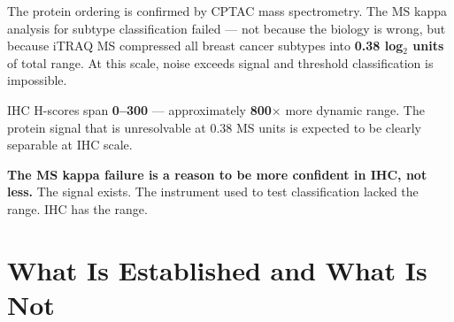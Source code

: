 \documentclass[11pt, a4paper]{article}
\begin{document}
\begin{mdframed}[backgroundcolor=dynamicbox,
                 linecolor=green!60!black,
                 linewidth=1pt]
The protein ordering is confirmed by CPTAC
mass spectrometry. The MS kappa analysis for
subtype classification failed --- not because
the biology is wrong, but because iTRAQ MS
compressed all breast cancer subtypes into
\textbf{0.38 log$_2$ units} of total range.
At this scale, noise exceeds signal and
threshold classification is impossible.

IHC H-scores span \textbf{0--300} ---
approximately \textbf{800$\times$} more
dynamic range. The protein signal that is
unresolvable at 0.38 MS units is expected
to be clearly separable at IHC scale.

\textbf{The MS kappa failure is a reason to
be more confident in IHC, not less.} The
signal exists. The instrument used to test
classification lacked the range. IHC has
the range.
\end{mdframed}

\section{What Is Established and What Is Not}
\label{sec:honesty}
\end{document}
